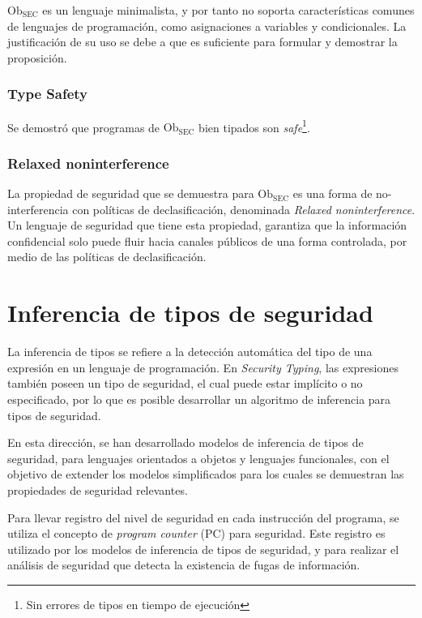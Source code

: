 	$\text{Ob}_{\text{SEC}}$ es un lenguaje minimalista, y por tanto no soporta características comunes de lenguajes de programación, como asignaciones a variables y condicionales. La justificación de su uso se debe a que es suficiente para formular y demostrar la proposición.

	\subsubsection{Type Safety}

	Se demostró que programas de $\text{Ob}_{\text{SEC}}$ bien tipados son \textit{safe}\footnote{Sin errores de tipos en tiempo de ejecución}.

	\subsubsection{Relaxed noninterference}

	La propiedad de seguridad que se demuestra para $\text{Ob}_{\text{SEC}}$ es una forma de no-interferencia con políticas de declasificación, denominada \textit{Relaxed noninterference}.	Un lenguaje de seguridad que tiene esta propiedad, garantiza que la información confidencial solo puede fluir hacia canales públicos de una forma controlada, por medio de las políticas de declasificación\cite{cruzAl:ecoop2017}.

	\section{Inferencia de tipos de seguridad}

	La inferencia de tipos se refiere a la detección automática del tipo de una expresión en un lenguaje de programación. En \textit{Security Typing}, las expresiones también poseen un tipo de seguridad, el cual puede estar implícito o no especificado, por lo que es posible desarrollar un algoritmo de inferencia para tipos de seguridad.

	En esta dirección, se han desarrollado modelos de inferencia de tipos de seguridad, para lenguajes orientados a objetos\cite{SunBanerjeeGiacobazzi} y lenguajes funcionales\cite{Pottier}, con el objetivo de extender los modelos simplificados para los cuales se demuestran las propiedades de seguridad relevantes.

	Para llevar registro del nivel de seguridad en cada instrucción del programa, se utiliza el concepto de \textit{program counter} (PC) para seguridad\cite{Molnar:2005}. Este registro es utilizado por los modelos de inferencia de tipos de seguridad, y para realizar el análisis de seguridad que detecta la existencia de fugas de información.

